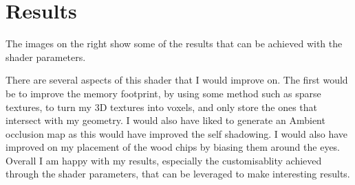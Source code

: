 \documentclass[]{acmsiggraph}
\begin{document}
\section{Results} \label{sec:results}
The images on the right show some of the results that can be achieved with the shader parameters.

There are several aspects of this shader that I would improve on. The first would be to improve the memory footprint, by using some method such as sparse textures, to turn my 3D textures into voxels, and only store the ones that intersect with my geometry. I would also have liked to generate an Ambient occlusion map as this would have improved the self shadowing. I would also have improved on my placement of the wood chips by biasing them around the eyes. Overall I am happy with my results, especially the customisablity achieved through the shader parameters, that can be leveraged to make interesting results.
\end{document}

